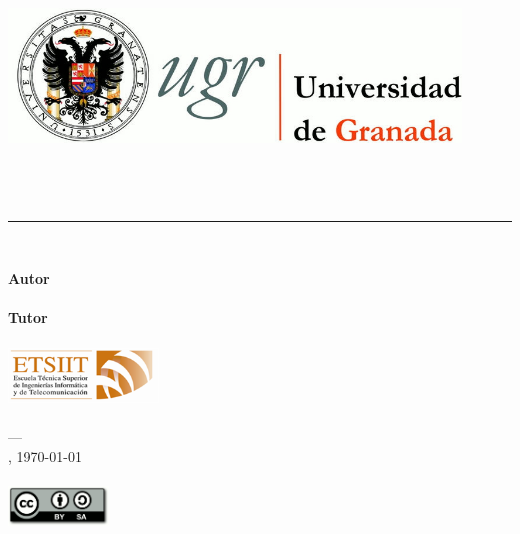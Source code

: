 \begin{titlepage}
\newlength{\centeroffset}
\setlength{\centeroffset}{-0.5\oddsidemargin}
\addtolength{\centeroffset}{0.5\evensidemargin}

\noindent\hspace*{\centeroffset}\begin{minipage}{\textwidth}

\centering
\includegraphics[width=0.9\textwidth]{../images/logo_ugr.png}\\[1.4cm]

\textsc{\Large\asunto\\[0.2cm]}
\textsc{\grado}\\[1cm]

{\Huge\bfseries \titulo\\}
\noindent\rule[-1ex]{\textwidth}{3pt}\\[3.5ex]
\end{minipage}

\vspace{0.5cm}
\noindent\hspace*{\centeroffset}\begin{minipage}{\textwidth}
\centering


\textbf{Autor}\\ {\autor}\\[2.5ex]
\textbf{Tutor}\\ {\tutor}\\[1cm]
\includegraphics[width=0.3\textwidth]{../images/logo_etsiit.png}\\[0.7cm]
\textsc{\escuela}\\
\textsc{---}\\
\ciudad, \today\\
\textsc{}\\[0.5cm]
\includegraphics[width=0.2\textwidth]{../images/CC-SA-logo.png}
\end{minipage}
\end{titlepage}
